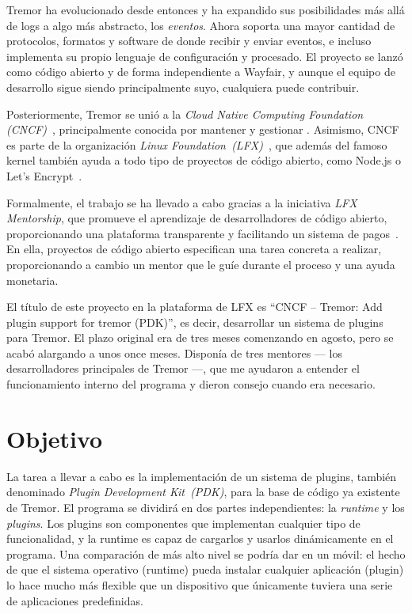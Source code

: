 Tremor ha evolucionado desde entonces y ha expandido sus posibilidades más allá
de logs a algo más abstracto, los \emph{eventos}. Ahora soporta una mayor
cantidad de protocolos, formatos y software de donde recibir y enviar eventos, e
incluso implementa su propio lenguaje de configuración y procesado. El proyecto
se lanzó como código abierto y de forma independiente a Wayfair, y aunque el
equipo de desarrollo sigue siendo principalmente suyo, cualquiera puede
contribuir.

Posteriormente, Tremor se unió a la \emph{Cloud Native Computing Foundation
(CNCF)}~\cite{cncf}, principalmente conocida por mantener y gestionar
. Asimismo, CNCF es parte de la organización \emph{Linux
Foundation~(LFX)}~\cite{lfx}, que además del famoso kernel también ayuda a todo
tipo de proyectos de código abierto, como Node.js o Let's
Encrypt~\cite{lfx_projects}.

Formalmente, el trabajo se ha llevado a cabo gracias a la iniciativa \emph{LFX
Mentorship}, que promueve el aprendizaje de desarrolladores de código abierto,
proporcionando una plataforma transparente y facilitando un sistema de
pagos~\cite{lfx_mentorship}. En ella, proyectos de código abierto especifican
una tarea concreta a realizar, proporcionando a cambio un mentor que le guíe
durante el proceso y una ayuda monetaria.

El título de este proyecto en la plataforma de LFX es ``CNCF -- Tremor: Add
plugin support for tremor (PDK)'', es decir, desarrollar un sistema de plugins
para Tremor. El plazo original era de tres meses comenzando en agosto, pero se
acabó alargando a unos once meses. Disponía de tres mentores --- los
desarrolladores principales de Tremor ---, que me ayudaron a entender el
funcionamiento interno del programa y dieron consejo cuando era necesario.

\section{Objetivo}

La tarea a llevar a cabo es la implementación de un sistema de plugins, también
denominado \emph{Plugin Development Kit~(PDK)}, para la base de código ya
existente de Tremor. El programa se dividirá en dos partes independientes: la
\emph{runtime} y los \emph{plugins}. Los plugins son componentes que implementan
cualquier tipo de funcionalidad, y la runtime es capaz de cargarlos y usarlos
dinámicamente en el programa. Una comparación de más alto nivel se podría dar en
un móvil: el hecho de que el sistema operativo (runtime) pueda instalar
cualquier aplicación (plugin) lo hace mucho más flexible que un dispositivo que
únicamente tuviera una serie de aplicaciones predefinidas.

